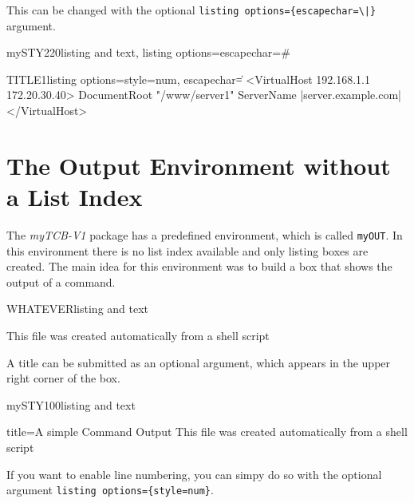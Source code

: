 \documentclass[]{myHOWTO-V001}
\begin{document}
This can be changed with the optional \verb#listing options={escapechar=\|}# argument.

\begin{myTEXEXdoclst}{mySTY220}{listing and text, listing options={escapechar=\#}}
\begin{myFILElst}{TITLE1}{listing options={style=num, escapechar=\|}}
<VirtualHost 192.168.1.1 172.20.30.40>
	DocumentRoot "/www/server1"
	ServerName |{\color{red}server.example.com}|
</VirtualHost>
\end{myFILElst}
\end{myTEXEXdoclst}

%
%

\section{The Output Environment without a List Index}

The \emph{myTCB-V1} package has a predefined environment, which is called \Verb|myOUT|. In this environment there is no list index available and only listing boxes are created. The main idea for this environment was to build a box that shows the output of a command.

\begin{myTEXEXdoclst}{WHATEVER}{listing and text}
\begin{myOUT}{}
This file was created automatically from
a shell script
\end{myOUT}
\end{myTEXEXdoclst}

A title can be submitted as an optional argument, which appears in the upper right corner of the box.

\begin{myTEXEXdoclst}{mySTY100}{listing and text}
\begin{myOUT}{title={A simple Command Output}}
This file was created automatically from
a shell script
\end{myOUT}
\end{myTEXEXdoclst}

If you want to enable line numbering, you can simpy do so with the optional argument \verb|listing options={style=num}|.
\end{document}
